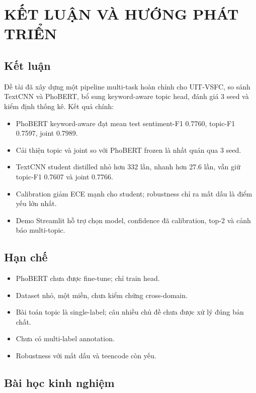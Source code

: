 \documentclass[12pt,a4paper]{report}
\begin{document}
\chapter{KẾT LUẬN VÀ HƯỚNG PHÁT TRIỂN}

\section{Kết luận}

Đề tài đã xây dựng một pipeline multi-task hoàn chỉnh cho UIT-VSFC, so sánh TextCNN và PhoBERT, bổ sung keyword-aware topic head, đánh giá 3 seed và kiểm định thống kê. Kết quả chính:

\begin{itemize}[leftmargin=1.2cm]
  \item PhoBERT keyword-aware đạt mean test sentiment-F1 0.7760, topic-F1 0.7597, joint 0.7989.
  \item Cải thiện topic và joint so với PhoBERT frozen là nhất quán qua 3 seed.
  \item TextCNN student distilled nhỏ hơn 332 lần, nhanh hơn 27.6 lần, vẫn giữ topic-F1 0.7607 và joint 0.7766.
  \item Calibration giảm ECE mạnh cho student; robustness chỉ ra mất dấu là điểm yếu lớn nhất.
  \item Demo Streamlit hỗ trợ chọn model, confidence đã calibration, top-2 và cảnh báo multi-topic.
\end{itemize}

\section{Hạn chế}

\begin{itemize}[leftmargin=1.2cm]
  \item PhoBERT chưa được fine-tune; chỉ train head.
  \item Dataset nhỏ, một miền, chưa kiểm chứng cross-domain.
  \item Bài toán topic là single-label; câu nhiều chủ đề chưa được xử lý đúng bản chất.
  \item Chưa có multi-label annotation.
  \item Robustness với mất dấu và teencode còn yếu.
\end{itemize}

\section{Bài học kinh nghiệm}
\end{document}
